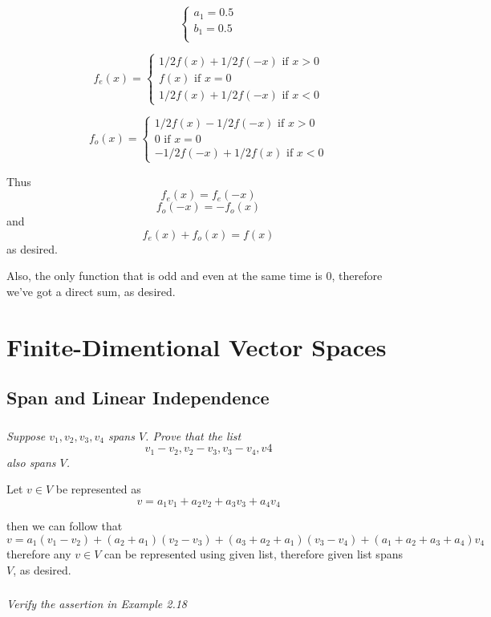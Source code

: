 \documentclass[11pt,oneside,titlepage]{book}
\begin{document}
$$
\begin{cases}
  a_1  = 0.5 \\
  b_1 = 0.5 \\
\end{cases}
$$

$$
f_e(x) =
\begin{cases}
  1/2 f(x) + 1/2 f(-x) \text{ if } x > 0 \\
  f(x) \text{ if } x = 0 \\
  1/2 f(x) + 1/2 f(-x)  \text{ if } x < 0
\end{cases}
$$

$$
f_o(x) =
\begin{cases}
  1/2 f(x) - 1/2 f(-x) \text{ if } x > 0 \\
  0 \text{ if } x = 0 \\
  -1/2 f(-x) + 1/2 f(x)  \text{ if } x < 0
\end{cases}
$$

Thus
$$f_e(x) = f_e(-x)$$
$$f_o(-x) = -f_o(x)$$
and
$$f_e(x) + f_o(x) = f(x)$$
as desired.

Also, the only function that is odd and even at the same time is $0$,
therefore we've got a direct sum, as desired.


\chapter{Finite-Dimentional Vector Spaces}

\section{Span and Linear Independence}

\subsection{}
\textit{Suppose $v_1, v_2, v_3, v_4$ spans $V$. Prove that the list }
$$v_1 - v_2, v_2 - v_3, v_3 - v_4, v4$$
\textit{also spans $V$.}

Let $v \in V$ be represented as
$$v = a_1 v_1 + a_2 v_2 + a_3 v_3 + a_4 v_4$$

then we can follow that
$$v = a_1 (v_1 - v_2) + (a_2 + a_1) (v_2 - v_3)+ (a_3 + a_2 + a_1) (v_3 - v_4) + (a_1 + a_2 + a_3 + a_4) v_4$$
therefore any $v \in V$ can be represented using given list, therefore
given list spans $V$, as desired.

\subsection{}
\textit{Verify the assertion in Example 2.18}
\end{document}
